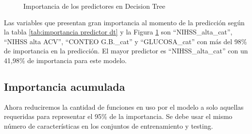 \begin{center}
    	\begin{figure}[H]
	\centering

	\caption{Importancia de los predictores en Decision Tree}
	\label{fig:ipdt}
	\end{figure}
\end{center}
    
    Las variables que presentan gran importancia al momento de la predicción según la tabla \ref{tab:importancia predictor dt} y la Figura \ref{fig:ipdt} son ``NIHSS\_alta\_cat'', ``NIHSS alta ACV'', ``CONTEO G.B.\_cat'' y ``GLUCOSA\_cat'' con más del 98\% de importancia en la predicción. El mayor predictor es ``NIHSS\_alta\_cat'' con un 41,98\% de importancia para este modelo.\\

    \hypertarget{importancia-acumulada}{%
\subsection{Importancia acumulada}\label{DT:importancia-acumulada}}

	Ahora reduciremos la cantidad de funciones en uso por el modelo a solo aquellas requeridas para representar el 95\% de la importancia. Se debe usar el mismo número de características en los conjuntos de entrenamiento y testing.

